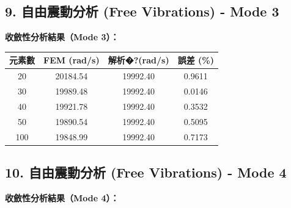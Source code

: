 \documentclass[UTF8, a4paper, 12pt]{ctexart}
\begin{document}
\subsection{9. 自由震動分析 (Free Vibrations) - Mode 3}



\textbf{收斂性分析結果（Mode 3）：}



\begin{center}

\begin{tabular}{cccc}

\toprule

\textbf{元素數} & \textbf{FEM (rad/s)} & \textbf{解析�?(rad/s)} & \textbf{誤差 (\%)} \\

\midrule

20 & 20184.54 & 19992.40 & 0.9611 \\

30 & 19989.48 & 19992.40 & 0.0146 \\

40 & 19921.78 & 19992.40 & 0.3532 \\

50 & 19890.54 & 19992.40 & 0.5095 \\

100 & 19848.99 & 19992.40 & 0.7173 \\

\bottomrule

\end{tabular}

\end{center}



\subsection{10. 自由震動分析 (Free Vibrations) - Mode 4}



\textbf{收斂性分析結果（Mode 4）：}
\end{document}
